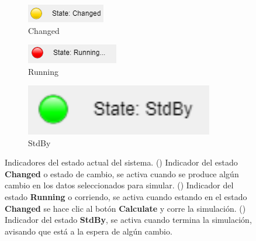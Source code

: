 	\begin{figure}[H]
		\centering
		\begin{subfigure}[b]{0.3\textwidth}
			\centering
			\includegraphics[width=\textwidth]{figuras/Procedimiento_Simulaciones/Radiacion/estado_changed}%
			\caption{Changed}%
			\label{fig:indicador_Changed2}%
		\end{subfigure}
		\hfill
		\begin{subfigure}[b]{0.3\textwidth}
			\centering
			\includegraphics[width=\textwidth]{figuras/Procedimiento_Simulaciones/Radiacion/estado_running}%
			\caption{Running}%
			\label{fig:indicador_Running2}%
		\end{subfigure}
		\hfill
		\begin{subfigure}[b]{0.3\textwidth}
			\centering
			\includegraphics[width=0.9\textwidth]{figuras/Procedimiento_Simulaciones/Radiacion/estado_stdby}%
			\caption{StdBy}%
			\label{fig:indicador_StdBy2}%
		\end{subfigure}
		\hfill
		\caption{Indicadores del estado actual del sistema. () Indicador del estado \textbf{Changed} o estado de cambio, se activa cuando se produce algún cambio en los datos seleccionados para simular. () Indicador del estado \textbf{Running} o corriendo, se activa cuando estando en el estado \textbf{Changed} se hace clic al botón \textbf{Calculate} y corre la simulación. () Indicador del estado \textbf{StdBy}, se activa cuando termina la simulación, avisando que está a la espera de algún cambio.}
		\label{fig:indicadorLED2}
	\end{figure}
